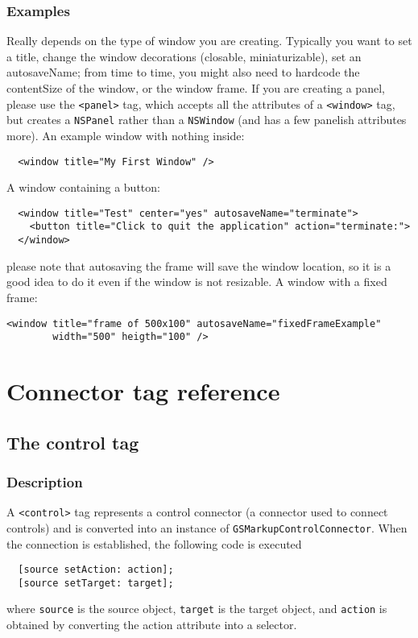 \subsubsection{Examples}
Really depends on the type of window you are creating.  Typically you
want to set a title, change the window decorations (closable,
miniaturizable), set an autosaveName; from time to time, you might
also need to hardcode the contentSize of the window, or the window
frame.  If you are creating a panel, please use the \texttt{<panel>}
tag, which accepts all the attributes of a \texttt{<window>} tag, but
creates a \texttt{NSPanel} rather than a \texttt{NSWindow} (and has a
few panelish attributes more).  An example window with nothing inside:
\begin{verbatim}
  <window title="My First Window" />
\end{verbatim}
A window containing a button:
\begin{verbatim}
  <window title="Test" center="yes" autosaveName="terminate">
    <button title="Click to quit the application" action="terminate:">
  </window>
\end{verbatim}
please note that autosaving the frame will save the window location,
so it is a good idea to do it even if the window is not resizable.  A
window with a fixed frame:
\begin{verbatim}
<window title="frame of 500x100" autosaveName="fixedFrameExample"
        width="500" heigth="100" />
\end{verbatim}


\section{Connector tag reference}

\subsection{The control tag}

\subsubsection{Description}
A \texttt{<control>} tag represents a control connector (a connector
used to connect controls) and is converted into an instance of
\texttt{GSMarkupControlConnector}.  When the connection is
established, the following code is executed
\begin{verbatim}
  [source setAction: action];
  [source setTarget: target];
\end{verbatim}
where \texttt{source} is the source object, \texttt{target} is the
target object, and \texttt{action} is obtained by converting the
action attribute into a selector.


